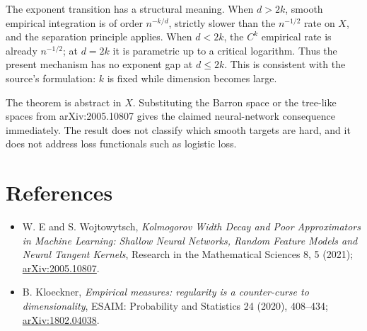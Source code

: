 \documentclass[11pt]{article}
\begin{document}
The exponent transition has a structural meaning.  When $d>2k$, smooth
empirical integration is of order $n^{-k/d}$, strictly slower than the
$n^{-1/2}$ rate on $X$, and the separation principle applies.  When $d<2k$,
the $C^k$ empirical rate is already $n^{-1/2}$; at $d=2k$ it is parametric up
to a critical logarithm.  Thus the present mechanism has no exponent gap at
$d\le2k$.  This is consistent with the source's formulation: $k$ is fixed
while dimension becomes large.

The theorem is abstract in $X$.  Substituting the Barron space or the
tree-like spaces from arXiv:2005.10807 gives the claimed neural-network
consequence immediately.  The result does not classify which smooth targets
are hard, and it does not address loss functionals such as logistic loss.

\section{References}

\begin{itemize}[leftmargin=*]
\item W. E and S. Wojtowytsch, \emph{Kolmogorov Width Decay and Poor
Approximators in Machine Learning: Shallow Neural Networks, Random Feature
Models and Neural Tangent Kernels}, Research in the Mathematical Sciences 8,
5 (2021); \href{https://arxiv.org/abs/2005.10807}{arXiv:2005.10807}.
\item B. Kloeckner, \emph{Empirical measures: regularity is a counter-curse
to dimensionality}, ESAIM: Probability and Statistics 24 (2020), 408--434;
\href{https://arxiv.org/abs/1802.04038}{arXiv:1802.04038}.
\end{itemize}
\end{document}

